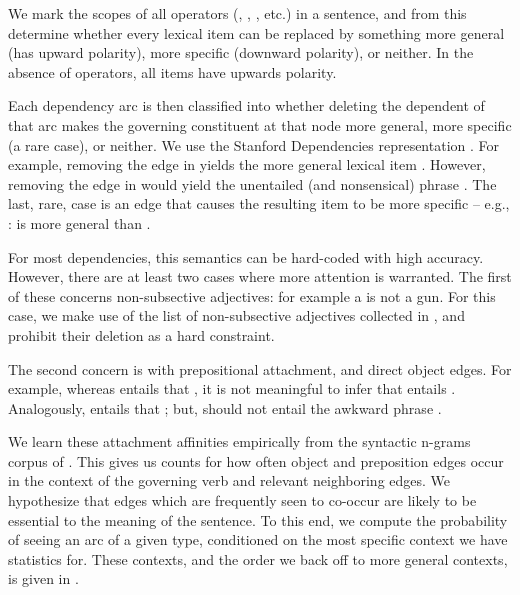 We mark the scopes of all operators (, , ,
  etc.) in a sentence, and from this determine whether every lexical item
  can be replaced by something more general (has upward polarity),
  more specific (downward polarity), or neither.
In the absence of operators, all items have upwards polarity.

Each dependency arc is then classified into whether deleting the dependent
  of that arc makes the governing constituent at that node more general,
  more specific (a rare case), or neither.
We use the Stanford Dependencies representation 
  \cite{key:stanford-dependencies}.
For example, removing the  edge in \hbox{} yields the
  more general lexical item .
However, removing the  edge in \hbox{} would yield the
  unentailed (and nonsensical) phrase .
The last, rare, case is an edge that causes the resulting item to be 
  more specific -- e.g., : 
  \hbox{} is more general than .

For most dependencies, this semantics can be hard-coded with high accuracy.
However, there are at least two cases where more attention is warranted.
The first of these concerns non-subsective adjectives: for example 
  a  is not a gun.
For this case, we make use of the list of non-subsective adjectives collected
  in , and prohibit their deletion as a
  hard constraint.

The second concern is with prepositional attachment, and direct object
  edges.
For example, whereas  entails
  that , it is not meaningful to infer that
   entails .
Analogously,  
  entails that ; but,  should not entail the
  awkward phrase .

We learn these attachment affinities empirically from the syntactic n-grams
  corpus of .
This gives us counts for how often object and preposition edges occur in the
  context of the governing verb and relevant neighboring edges.
We hypothesize that edges which are frequently seen to co-occur 
  are likely
  to be essential to the meaning of the sentence.
To this end, we compute the probability of seeing an arc of a given type,
  conditioned on the most specific context we have statistics for.
These contexts, and the order we back off to more general contexts,
  is given in .


